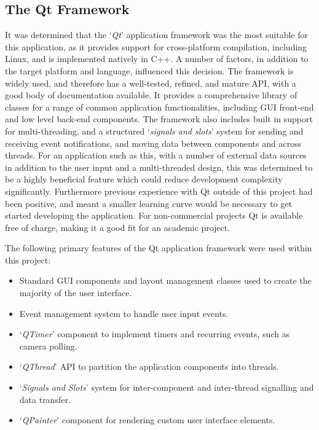 \subsection{The Qt Framework}
It was determined that the `\textit{Qt}' application framework was the most suitable for this application, as it provides support for cross-platform compilation, including Linux, and is implemented natively in C++. A number of factors, in addition to the target platform and language, influenced this decision. The framework is widely used, and therefore has a well-tested, refined, and mature API, with a good body of documentation available. It provides a comprehensive library of classes for a range of common application functionalities, including GUI front-end and low level back-end components. The framework also includes built in support for multi-threading, and a structured `\textit{signals and slots}' system for sending and receiving event notifications, and moving data between components and across threads. For an application such as this, with a number of external data sources in addition to the user input and a multi-threaded design, this was determined to be a highly beneficial feature which could reduce development complexity significantly. Furthermore previous experience with Qt outside of this project had been positive, and meant a smaller learning curve would be necessary to get started developing the application. For non-commercial projects Qt is available free of charge, making it a good fit for an academic project.

The following primary features of the Qt application framework were used within this project:

\begin{itemize}
 \item Standard GUI components and layout management classes used to create the majority of the user interface.
 \item Event management system to handle user input events.
 \item `\textit{QTimer}' component to implement timers and recurring events, such as camera polling.
 \item `\textit{QThread}' API to partition the application components into threads.
 \item `\textit{Signals and Slots}' system for inter-component and inter-thread signalling and data transfer.
 \item `\textit{QPainter}' component for rendering custom user interface elements.
\end{itemize}

